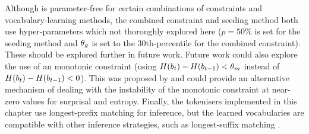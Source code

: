 
Although \bytespan is parameter-free for certain combinations of constraints and vocabulary-learning methods, the combined constraint and seeding method both use hyper-parameters which not thoroughly explored here ($p=50\%$ is set for the seeding method and $\theta_g$ is set to the 30th-percentile for the combined constraint). These should be explored further in future work. Future work could also explore the use of an  monotonic constraint (using $H(b_t) - H(b_{t-1}) < \theta_m$ instead of $H(b_t) - H(b_{t-1}) < 0$). This was proposed by \citet{pagnoni2024byte} and could provide an alternative mechanism of dealing with the instability of the monotonic constraint at near-zero values for surprisal and entropy. Finally, the tokenisers implemented in this chapter use longest-prefix matching for inference, but the learned vocabularies are compatible with other inference strategies, such as longest-suffix matching \citep{jacobs2022lost}.




